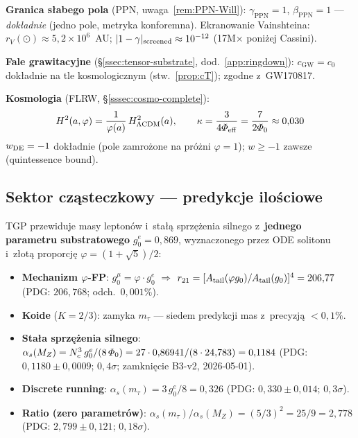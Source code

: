 \noindent\textbf{Granica s\l{}abego pola} (PPN, uwaga~\ref{rem:PPN-Will}):
$\gamma_{\mathrm{PPN}} = 1$,\;
$\beta_{\mathrm{PPN}} = 1$ --- \emph{dok\l{}adnie}
(jedno pole, metryka konforemna).
Ekranowanie Vainshteina: $r_V(\odot) \approx 5{,}2\times 10^6$~AU;
$|1-\gamma|_{\rm screened} \approx 10^{-12}$ (17M$\times$ poni\.zej Cassini).

\noindent\textbf{Fale grawitacyjne} (\S\ref{ssec:tensor-substrate}, dod.~\ref{app:ringdown}):
$c_{\mathrm{GW}} = c_0$ dok\l{}adnie na tle kosmologicznym
(stw.~\ref{prop:cT}); zgodne z~GW170817.

\noindent\textbf{Kosmologia} (FLRW, \S\ref{sssec:cosmo-complete}):
\begin{equation}
H^2(a,\varphi) = \frac{1}{\varphi(a)}\,H^2_{\Lambda\mathrm{CDM}}(a),
\qquad
\kappa = \frac{3}{4\varPhi_{\mathrm{eff}}} = \frac{7}{2\varPhi_0} \approx 0{,}030
\end{equation}
$w_{\rm DE} = -1$ dok\l{}adnie (pole zamro\.zone na pr\'o\.zni
$\varphi = 1$); $w \geq -1$ zawsze (quintessence bound).

\subsection*{Sektor cz\k{a}steczkowy --- predykcje ilo\'sciowe}

TGP przewiduje masy lepton\'ow i~sta\l{}\k{a} sprz\k{e}\.zenia
silnego z~\textbf{jednego parametru substratowego} $g_0^e = 0{,}869$,
wyznaczonego przez ODE solitonu i~z\l{}ot\k{a} proporcj\k{e}
$\varphi = (1+\sqrt{5})/2$:

\begin{itemize}[nosep]
\item \textbf{Mechanizm $\varphi$-FP}: $g_0^\mu = \varphi \cdot g_0^e$
  \;\;$\Rightarrow$\;\; $r_{21} = [A_{\rm tail}(\varphi g_0)/A_{\rm tail}(g_0)]^4 = 206{,}77$
  (PDG: $206{,}768$; odch.\ $0{,}001\%$).
\item \textbf{Koide} ($K = 2/3$): zamyka $m_\tau$ --- siedem predykcji mas z~precyzj\k{a} $< 0{,}1\%$.
\item \textbf{Sta\l{}a sprz\k{e}\.zenia silnego}:
  $\alpha_s(M_Z) = N_c^3\, g_0^e/(8\,\varPhi_0)
  = 27 \cdot 0{,}86941/(8 \cdot 24{,}783) = 0{,}1184$
  (PDG: $0{,}1180 \pm 0{,}0009$; $0{,}4\sigma$;
  zamkni\k{e}cie B3-v2, 2026-05-01).
\item \textbf{Discrete running}:
  $\alpha_s(m_\tau) = 3\,g_0^e/8 = 0{,}326$
  (PDG: $0{,}330 \pm 0{,}014$; $0{,}3\sigma$).
\item \textbf{Ratio (zero parametr\'ow)}:
  $\alpha_s(m_\tau)/\alpha_s(M_Z) = (5/3)^2 = 25/9 = 2{,}778$
  (PDG: $2{,}799 \pm 0{,}121$; $0{,}18\sigma$).
\end{itemize}


